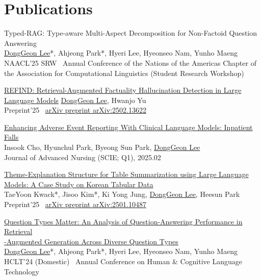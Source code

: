 \documentclass[letterpaper,11pt]{article}
\begin{document}
    \section{Publications}
    \begin{enumerate}[noitemsep, leftmargin=*,label={[\arabic*]},itemsep=0.6em]
        \item Typed-RAG: Type-aware Multi-Aspect Decomposition for Non-Factoid Question Answering\\
        \underline{DongGeon Lee}*, Ahjeong Park*, Hyeri Lee, Hyeonseo Nam, Yunho Maeng \\[3pt]
        NAACL'25 SRW \textbar\ Annual Conference of the Nations of the Americas Chapter of the Association for Computational Linguistics (Student Research Workshop)

        \item \href{https://arxiv.org/abs/2502.13622}{REFIND: Retrieval-Augmented Factuality Hallucination Detection in Large Language Models}
        \underline{DongGeon Lee}, Hwanjo Yu \\[3pt]
        Preprint'25 \textbar\ \href{https://arxiv.org/abs/2502.13622}{arXiv preprint arXiv:2502.13622}
            
        \item \href{https://doi.org/10.1111/jan.16812}{Enhancing Adverse Event Reporting With Clinical Language Models: Inpatient Falls}\\
        Insook Cho, Hyunchul Park, Byeong Sun Park, \underline{DongGeon Lee} \\[3pt]
        Journal of Advanced Nursing (SCIE; Q1), 2025.02

        \item \href{https://arxiv.org/abs/2501.10487}{Theme-Explanation Structure for Table Summarization using Large Language Models: A Case Study on Korean Tabular Data} \\
        TaeYoon Kwack*, Jisoo Kim*, Ki Yong Jung, \underline{DongGeon Lee}, Heesun Park  \\[3pt]
        Preprint'25 \textbar\ 
        \href{https://arxiv.org/abs/2501.10487}{arXiv preprint arXiv:2501.10487}

        \item \href{https://koreascience.kr/article/CFKO202404272002603.page}{Question Types Matter: An Analysis of Question-Answering Performance in Retrieval\\-Augmented Generation Across Diverse Question Types}\\
        \underline{DongGeon Lee}*, Ahjeong Park*, Hyeri Lee, Hyeonseo Nam, Yunho Maeng \\[3pt]
        HCLT'24 (Domestic) \textbar\ Annual Conference on Human \& Cognitive Language Technology 


\end{enumerate}
\end{document}
